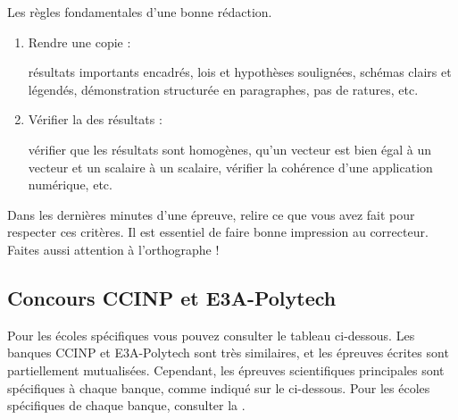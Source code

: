\documentclass[12pt,fancy]{cours}
\begin{document}
  Les règles fondamentales d'une bonne rédaction.
 \begin{enumerate}
 \item Rendre une copie  :
 
 résultats importants encadrés, lois et hypothèses soulignées, schémas clairs et légendés, démonstration structurée en paragraphes, pas de ratures, etc.
 
 \item Vérifier la  des résultats :
 
 vérifier que les résultats sont homogènes, qu'un vecteur est bien égal à un vecteur et un scalaire à un scalaire, vérifier la cohérence d'une application numérique, etc.
 \end{enumerate}
 Dans les dernières minutes d'une épreuve, relire ce que vous avez fait pour respecter ces critères. Il est essentiel de faire bonne impression au correcteur. Faites aussi attention à l'orthographe !


\subsection{Concours CCINP et E3A-Polytech}
  Pour les écoles spécifiques vous pouvez consulter le tableau ci-dessous.
Les banques CCINP et E3A-Polytech sont très similaires, et les épreuves écrites sont partiellement mutualisées. Cependant, les épreuves scientifiques principales sont spécifiques à chaque banque, comme indiqué sur le  ci-dessous.  Pour les écoles spécifiques de chaque banque, consulter la .

\def\note{{\color{JoliRouge}\textsuperscript{*}}}
\def\nnote{{\color{JoliBleu}\textsuperscript{**}}}
\def\Note{{\color{JoliRouge}{\large {$\star$}}}}
\def\Nnote{{\color{JoliBleu}{\large {$\star\star$}}}}
\end{document}
